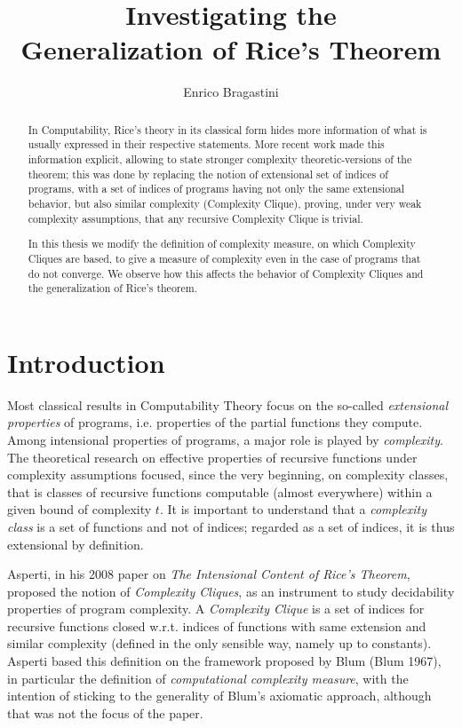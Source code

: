 \documentclass[10pt, a4paper, oneside, titlepage, draft]{article}
\title{Investigating the\\Generalization of Rice's Theorem}
\author{Enrico Bragastini}
\date{}
\begin{document}
\maketitle

\begin{abstract}
In Computability, Rice's theory in its classical form hides more information of what is usually expressed in their respective statements. More recent work made this information explicit, allowing to state stronger complexity theoretic-versions of the theorem; this was done by replacing the notion of extensional set of indices of programs, with a set of indices of programs having not only the same extensional behavior, but also similar complexity (Complexity Clique), proving, under very weak complexity assumptions, that any recursive Complexity Clique is trivial. 

In this thesis we modify the definition of complexity measure, on which Complexity Cliques are based, to give a measure of complexity even in the case of programs that do not converge. We observe how this affects the behavior of Complexity Cliques and the generalization of Rice's theorem.
\end{abstract}

\section{Introduction}
Most classical results in Computability Theory focus on the so-called \textit{extensional properties} of programs, i.e. properties of the partial functions they compute.
Among intensional properties of programs, a major role is played by \textit{complexity}.
The theoretical research on effective properties of recursive functions under complexity assumptions focused, since the very beginning, on complexity classes, that is classes of recursive functions computable (almost everywhere) within a given bound of complexity $t$.
It is important to understand that a \textit{complexity class} is a set of functions and not of indices; regarded as a set of indices, it is thus extensional by definition.

Asperti, in his 2008 paper on \textit{The Intensional Content of Rice's Theorem}, proposed the notion of \textit{Complexity Cliques}, as an instrument to study decidability properties of program complexity.
A \textit{Complexity Clique} is a set of indices for recursive functions closed w.r.t. indices of functions with same extension and similar complexity (defined in the only sensible way, namely up to constants).
Asperti based this definition on the framework proposed by Blum (Blum 1967), in particular the definition of \textit{computational complexity measure}, with the intention of sticking to the generality of Blum's axiomatic approach, although that was not the focus of the paper.
\end{document}

